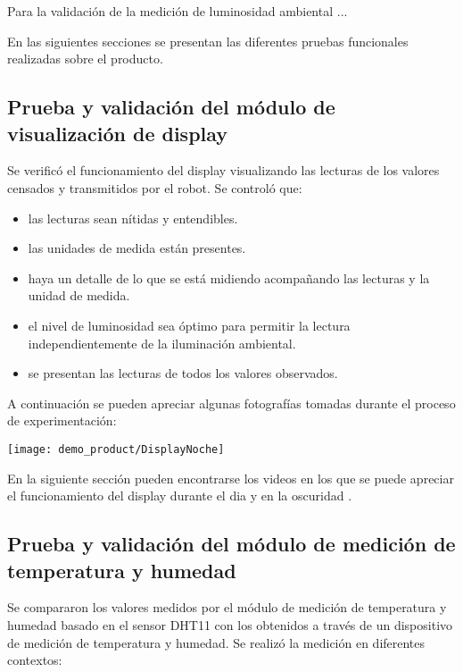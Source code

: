 Para la validación de la medición de luminosidad ambiental ...

En las siguientes secciones se presentan las diferentes pruebas funcionales realizadas sobre el producto.



\subsection{Prueba y validación del módulo de visualización de display}

Se verificó el funcionamiento del display visualizando las lecturas de los valores censados y transmitidos por el robot. Se controló que:

\begin{itemize}
	\item las lecturas sean nítidas y entendibles.
	\item las unidades de medida están presentes.
	\item haya un detalle de lo que se está midiendo acompañando las lecturas y la unidad de medida.
	\item el nivel de luminosidad sea óptimo para permitir la lectura independientemente de la iluminación ambiental.
	\item se presentan las lecturas de todos los valores observados.
\end{itemize}


A continuación se pueden apreciar algunas fotografías tomadas durante el proceso de experimentación:

\begin{center}
\texttt{[image: demo\_product/DisplayNoche]}
  \label{fig:DisplayNoche}
\end{center}


En la siguiente sección pueden encontrarse los videos en los que se puede apreciar el funcionamiento del display durante el dia \cite{Demo_Mediciones} y en la oscuridad \cite{Demo_Display_Oscuridad}.

\subsection{Prueba y validación del módulo de medición de temperatura y humedad}

Se compararon los valores medidos por el módulo de medición de temperatura y humedad basado en el sensor DHT11 con los obtenidos a través de un dispositivo de medición de temperatura y humedad. Se realizó la medición en diferentes contextos:

